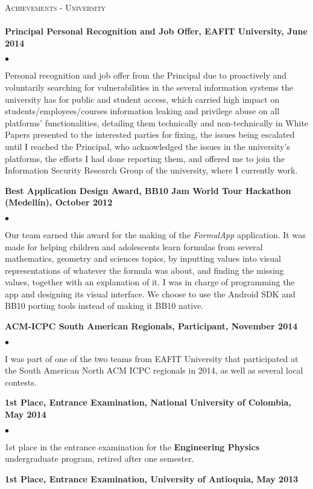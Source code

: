 \documentclass{article}
\newcommand{\lineunder}{\vspace*{-8pt} \\ \hspace*{-18pt} \hrulefill \\}
\newcommand{\header}[1]{{\hspace*{-15pt}\vspace*{6pt}
    \textsc{#1}} \vspace*{-6pt} \lineunder}
\newenvironment{achievements}{\begin{list}{$\bullet$}{\topsep 2pt \itemsep
      -2pt}}{\vspace*{5pt}\end{list}}
\begin{document}
\header{Achievements - University}
\textbf{Principal Personal Recognition and Job Offer, EAFIT University, June 2014}
\begin{achievements}
\item Personal recognition and job offer from the Principal due to proactively and voluntarily searching for vulnerabilities in the several information systems the university has for public and student access, which carried high impact on students/employees/courses information leaking and privilege abuse on all platforms' functionalities, detailing them technically and non-technically in White Papers presented to the interested parties for fixing, the issues being escalated until I reached the Principal, who acknowledged the issues in the university's platforms, the efforts I had done reporting them, and offered me to join the Information Security Research Group of the university, where I currently work.
\end{achievements}
\textbf{Best Application Design Award, BB10 Jam World Tour Hackathon (Medell\'in), October 2012}
\begin{achievements}
\item Our team earned this award for the making of the \textit{FormulApp} application. It was made for helping children and adolescents learn formulas from several mathematics, geometry and sciences topics, by inputting values into visual representations of whatever the formula was about, and finding the missing values, together with an explanation of it. I was in charge of programming the app and designing its visual interface. We choose to use the Android SDK and BB10 porting tools instead of making it BB10 native.
\end{achievements}
\textbf{ACM-ICPC South American Regionals, Participant, November 2014}
\begin{achievements}
\item I was part of one of the two teams from EAFIT University that participated at the South American North ACM ICPC regionals in 2014, as well as several local contests.
\end{achievements}
\textbf{1st Place, Entrance Examination, National University of Colombia, May 2014}
\begin{achievements}
\item 1st place in the entrance examination for the \textbf{Engineering Physics} undergraduate program, retired after one semester.
\end{achievements}
\textbf{1st Place, Entrance Examination, University of Antioquia, May 2013}
\end{document}
